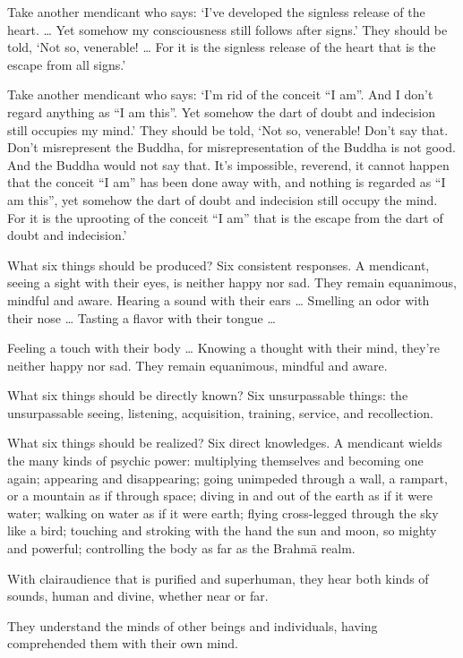 \documentclass[12pt,openany]{book}%
\begin{document}
Take another mendicant who says: ‘I’ve developed the signless release of the heart. … Yet somehow my consciousness still follows after signs.’ They should be told, ‘Not so, venerable! … For it is the signless release of the heart that is the escape from all signs.’ 

Take another mendicant who says: ‘I’m rid of the conceit “I am”. And I don’t regard anything as “I am this”. Yet somehow the dart of doubt and indecision still occupies my mind.’ They should be told, ‘Not so, venerable! Don’t say that. Don’t misrepresent the Buddha, for misrepresentation of the Buddha is not good. And the Buddha would not say that. It’s impossible, reverend, it cannot happen that the conceit “I am” has been done away with, and nothing is regarded as “I am this”, yet somehow the dart of doubt and indecision still occupy the mind. For it is the uprooting of the conceit “I am” that is the escape from the dart of doubt and indecision.’ 

What six things should be produced? Six consistent responses. A mendicant, seeing a sight with their eyes, is neither happy nor sad. They remain equanimous, mindful and aware. Hearing a sound with their ears … Smelling an odor with their nose … Tasting a flavor with their tongue … 

Feeling a touch with their body … Knowing a thought with their mind, they’re neither happy nor sad. They remain equanimous, mindful and aware. 

What six things should be directly known? Six unsurpassable things: the unsurpassable seeing, listening, acquisition, training, service, and recollection. 

What six things should be realized? Six direct knowledges. A mendicant wields the many kinds of psychic power: multiplying themselves and becoming one again; appearing and disappearing; going unimpeded through a wall, a rampart, or a mountain as if through space; diving in and out of the earth as if it were water; walking on water as if it were earth; flying cross-legged through the sky like a bird; touching and stroking with the hand the sun and moon, so mighty and powerful; controlling the body as far as the \textsanskrit{Brahmā} realm. 

With clairaudience that is purified and superhuman, they hear both kinds of sounds, human and divine, whether near or far. 

They understand the minds of other beings and individuals, having comprehended them with their own mind. 
\end{document}
